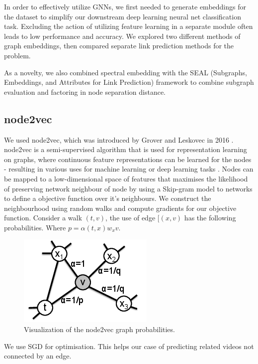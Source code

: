 \documentclass[10pt,twocolumn,letterpaper]{article}
\begin{document}
In order to effectively utilize GNNs, we first needed to generate embeddings for the dataset to simplify our downstream deep learning neural net classification task. Excluding the action of utilizing feature learning in a separate module often leads to low performance and accuracy. We explored two different methods of graph embeddings, then compared separate link prediction methods for the problem. 

As a novelty, we also combined spectral embedding with the SEAL (Subgraphs, Embeddings, and Attributes for Link Prediction) framework to combine subgraph evaluation and factoring in node separation distance.

\subsection{node2vec}

We used node2vec, which was introduced by Grover and Leskovec in 2016 \cite{node2vec}. node2vec is a semi-supervised algorithm that is used for representation learning on graphs, where continuous feature representations can be learned for the nodes - resulting in various uses for machine learning or deep learning tasks \cite{node2vec}. Nodes can be mapped to a low-dimensional space of features that maximises the likelihood of preserving network neighbour of node by using a Skip-gram model to networks to define a objective function over it's neighbours. We construct the neighbourhood using random walks and compute gradients for our objective function. Consider a walk $(t, v)$, the use of edge $[(x, v)$ has the following probabilities. Where $p = \alpha(t, x)w_xv$.

\begin{figure}[h]
\begin{center}
\includegraphics[scale=0.35]{latex/images/node2vec-viz.png}
\end{center}
\caption{Visualization of the node2vec graph probabilities.}
\end{figure}

We use SGD for optimisation. This helps our case of predicting related videos not connected by an edge.
\end{document}
